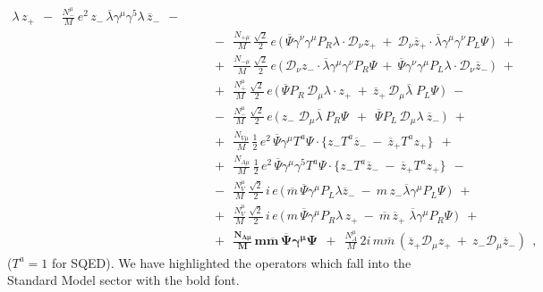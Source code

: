 \documentclass[12pt]{revtex4}
\begin{document}
\begin{eqnarray}
\lambda\, z_+ 
~~-~~
\frac{N_-^\mu}{M}\, e^2\,
z_-\, \overline{\lambda}\gamma^\mu\gamma^5
\lambda\, \overline{z}_-
~~-~~ \\
\nonumber
&&
~~-~~
\frac{N_{+\mu}}{M}\,
\frac{\sqrt{2}}{2}\, e\,
\Big(\,
\overline{\Psi} \gamma^\nu\gamma^\mu P_R
\lambda \cdot \mathcal{D}_\nu z_+ 
~+~
\mathcal{D}_\nu \overline{z}_+ \cdot
\overline{\lambda} \gamma^\mu \gamma^\nu
P_L \Psi
\,
\Big)
~~+~~ \\
\nonumber
&&
~~+~~
\frac{N_{-\mu}}{M}\,
\frac{\sqrt{2}}{2}\,e\,
\Big(\,
\mathcal{D}_\nu z_- \cdot
\overline{\lambda}\gamma^\mu\gamma^\nu P_R \Psi
~+~
\overline{\Psi}\gamma^\nu\gamma^\mu P_L \lambda
\cdot \mathcal{D}_\nu \overline{z}_-
\,
\Big)
~~+~~ \\
\label{LV_matter_component}
&&
~~+~~
\frac{N_+^\mu}{M}\,
\frac{\sqrt{2}}{2}\, e\,
\Big(\,
\overline{\Psi}P_R\, \mathcal{D}_\mu \lambda
\cdot z_+ 
~+~
\overline{z}_+ \,
\mathcal{D}_\mu 
\overline{\lambda}\; P_L \Psi
\,\Big)
~~-~~ \\
\nonumber
&&
~~-~~
\frac{N_-^\mu}{M}\,
\frac{\sqrt{2}}{2}\, e\,
\Big(\,
z_-\; \mathcal{D}_\mu \overline{\lambda} ~
P_R \Psi 
~~+~~
\overline{\Psi} P_L \, \mathcal{D}_\mu \lambda ~
\overline{z}_-
\,\Big) 
~~+~~ \\
\nonumber
&&
~~+~~ 
\frac{N_{V\mu}}{M}\,
\frac{1}{2}\, e^2\,
\overline{\Psi}\gamma^\mu T^a \Psi \cdot
\Big\{
  z_- T^a \overline{z}_- 
  ~-~
  \overline{z}_+ T^a z_+
\Big\}
~~+~~ \\
\nonumber
&&
~~+~~
\frac{N_{A\mu}}{M}\,
\frac{1}{2}\, e^2\,
\overline{\Psi}\gamma^\mu \gamma^5 T^a \Psi \cdot
\Big\{
  z_- T^a \overline{z}_- 
  ~-~
  \overline{z}_+ T^a z_+
\Big\}
~~-~~ \\
\nonumber
&&
~~-~~
\frac{N_V^\mu}{M}\,
\frac{\sqrt{2}}{2}\, i\, e\,
\Big(\,
\overline{m}\, \overline{\Psi} \gamma^\mu P_L
\lambda \overline{z}_- 
~-~
m\, z_- \overline{\lambda}
\gamma^\mu P_L \Psi
\,\Big)
~~+~~ \\
\nonumber
&&
~~+~~
\frac{N_V^\mu}{M}\,
\frac{\sqrt{2}}{2}\, i\, e\,
\Big(\,
m\, \overline{\Psi}\gamma^\mu P_R \lambda\, z_+ 
~-~
\overline{m}\, \overline{z}_+\; \overline{\lambda}
\gamma^\mu P_R \Psi
\,\Big)
~~+~~ \\
\nonumber
&&
~~+~~
\boldsymbol{
\frac{N_{A\mu}}{M}\,
m \overline{m} \,
\overline{\Psi} \gamma^\mu \Psi
    }
~~+~~ 
\frac{N_A^\mu}{M}\, 2 i\, m \overline{m}\,
\left( 
\overline{z}_+ \mathcal{D}_\mu z_+ 
~+~
z_- \mathcal{D}_\mu \overline{z}_-
\right)
~~,
\end{eqnarray}
($ T^a = 1 $ for SQED).
We have highlighted the operators which fall into the 
Standard Model sector with the bold font.
\end{document}
